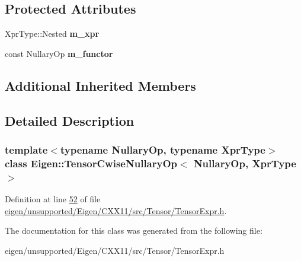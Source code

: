 \subsection*{Protected Attributes}
\begin{DoxyCompactItemize}
\item 
\mbox{\label{class_eigen_1_1_tensor_cwise_nullary_op_ab08907683b655ab7b61c560e8b665597}} 
Xpr\+Type\+::\+Nested {\bfseries m\+\_\+xpr}
\item 
\mbox{\label{class_eigen_1_1_tensor_cwise_nullary_op_a91ee2da2a958c8c301b4679145406acf}} 
const Nullary\+Op {\bfseries m\+\_\+functor}
\end{DoxyCompactItemize}
\subsection*{Additional Inherited Members}


\subsection{Detailed Description}
\subsubsection*{template$<$typename Nullary\+Op, typename Xpr\+Type$>$\newline
class Eigen\+::\+Tensor\+Cwise\+Nullary\+Op$<$ Nullary\+Op, Xpr\+Type $>$}



Definition at line \hyperlink{eigen_2unsupported_2_eigen_2_c_x_x11_2src_2_tensor_2_tensor_expr_8h_source_l00052}{52} of file \hyperlink{eigen_2unsupported_2_eigen_2_c_x_x11_2src_2_tensor_2_tensor_expr_8h_source}{eigen/unsupported/\+Eigen/\+C\+X\+X11/src/\+Tensor/\+Tensor\+Expr.\+h}.



The documentation for this class was generated from the following file\+:\begin{DoxyCompactItemize}
\item 
eigen/unsupported/\+Eigen/\+C\+X\+X11/src/\+Tensor/\+Tensor\+Expr.\+h\end{DoxyCompactItemize}
